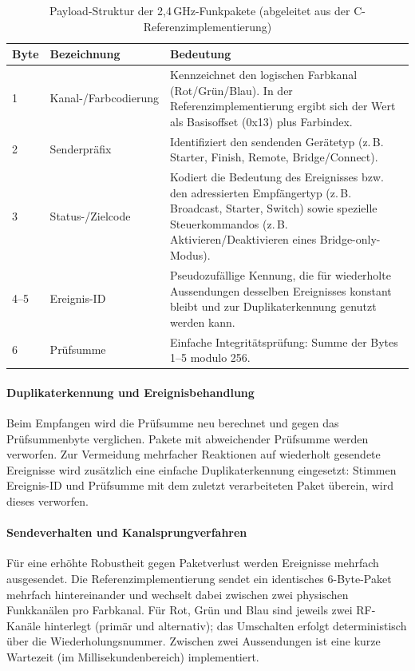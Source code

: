 \begin{table}[ht]
\centering
\begin{tabularx}{\textwidth}{@{}l l X@{}}
\toprule
\textbf{Byte} & \textbf{Bezeichnung} & \textbf{Bedeutung} \\
\midrule
1 & Kanal-/Farbcodierung & Kennzeichnet den logischen Farbkanal (Rot/Gr\"un/Blau). In der Referenzimplementierung ergibt sich der Wert als Basisoffset (0x13) plus Farbindex. \\
2 & Senderpr\"afix & Identifiziert den sendenden Gerätetyp (z.\,B. Starter, Finish, Remote, Bridge/Connect). \\
3 & Status-/Zielcode & Kodiert die Bedeutung des Ereignisses bzw. den adressierten Empfängertyp (z.\,B. Broadcast, Starter, Switch) sowie spezielle Steuerkommandos (z.\,B. Aktivieren/Deaktivieren eines Bridge-only-Modus). \\
4--5 & Ereignis-ID & Pseudozufällige Kennung, die für wiederholte Aussendungen desselben Ereignisses konstant bleibt und zur Duplikaterkennung genutzt werden kann. \\
6 & Prüfsumme & Einfache Integritätsprüfung: Summe der Bytes 1--5 modulo 256. \\
\bottomrule
\end{tabularx}
\caption{Payload-Struktur der 2{,}4\,GHz-Funkpakete (abgeleitet aus der C-Referenzimplementierung)}
\end{table}

\paragraph{Duplikaterkennung und Ereignisbehandlung}
Beim Empfangen wird die Prüfsumme neu berechnet und gegen das Prüfsummenbyte verglichen.
Pakete mit abweichender Prüfsumme werden verworfen.
Zur Vermeidung mehrfacher Reaktionen auf wiederholt gesendete Ereignisse wird zusätzlich eine einfache Duplikaterkennung eingesetzt: Stimmen Ereignis-ID und Prüfsumme mit dem zuletzt verarbeiteten Paket überein, wird dieses verworfen.

\paragraph{Sendeverhalten und Kanalsprungverfahren}
Für eine erhöhte Robustheit gegen Paketverlust werden Ereignisse mehrfach ausgesendet.
Die Referenzimplementierung sendet ein identisches 6-Byte-Paket mehrfach hintereinander und wechselt dabei zwischen zwei physischen Funkkanälen pro Farbkanal.
Für Rot, Gr\"un und Blau sind jeweils zwei RF-Kanäle hinterlegt (primär und alternativ); das Umschalten erfolgt deterministisch über die Wiederholungsnummer.
Zwischen zwei Aussendungen ist eine kurze Wartezeit (im Millisekundenbereich) implementiert.

